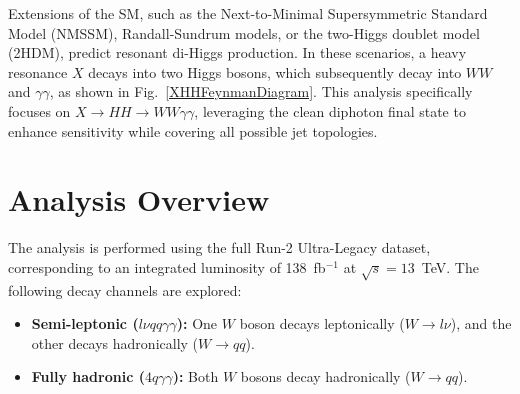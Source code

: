 Extensions of the SM, such as the Next-to-Minimal Supersymmetric Standard Model (NMSSM), Randall-Sundrum models, or the two-Higgs
doublet model (2HDM), predict resonant di-Higgs production. In these scenarios, a heavy resonance \(X\) decays into two Higgs
bosons, which subsequently decay into \(WW\) and \(\gamma\gamma\), as shown in Fig.~\ref{XHHFeynmanDiagram}. This analysis specifically focuses on \(X \to HH \to
WW\gamma\gamma\), leveraging the clean diphoton final state to enhance sensitivity while covering all possible jet topologies.


\section{Analysis Overview}
The analysis is performed using the full Run-2 Ultra-Legacy dataset, corresponding to an integrated luminosity of 138~fb\(^{-1}\) at
\(\sqrt{s} = 13\)~TeV. The following decay channels are explored:
\begin{itemize}
    \item \textbf{Semi-leptonic (\(l\nu qq\gamma\gamma\)):} One \(W\) boson decays leptonically (\(W \to l\nu\)), and the other
    decays hadronically (\(W \to qq\)).
    \item \textbf{Fully hadronic (\(4q\gamma\gamma\)):} Both \(W\) bosons decay hadronically (\(W \to qq\)).
\end{itemize}

